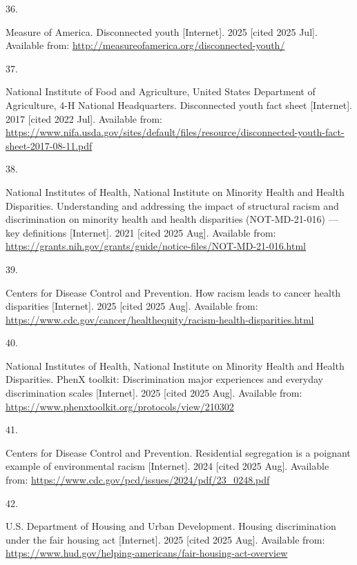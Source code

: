 \documentclass[
  english,
  letterpaper,
]{report}
\newlength{\cslhangindent}
\newlength{\csllabelwidth}
\newenvironment{CSLReferences}[2] %
 {\begin{list}{}{%
  \setlength{\itemindent}{0pt}
  \setlength{\leftmargin}{0pt}
  \setlength{\parsep}{0pt}
  \ifodd #1
   \setlength{\leftmargin}{\cslhangindent}
   \setlength{\itemindent}{-1\cslhangindent}
  \fi
  \setlength{\itemsep}{#2\baselineskip}}}
 {\end{list}}
\newcommand{\CSLLeftMargin}[1]{\parbox[t]{\csllabelwidth}{\strut#1\strut}}
\newcommand{\CSLRightInline}[1]{\parbox[t]{\linewidth - \csllabelwidth}{\strut#1\strut}}
\begin{document}
\begin{CSLReferences}{0}{1}
\CSLLeftMargin{36. }%
\CSLRightInline{Measure of America. Disconnected youth {[}Internet{]}.
2025 {[}cited 2025 Jul{]}. Available from:
\url{http://measureofamerica.org/disconnected-youth/}}

\CSLLeftMargin{37. }%
\CSLRightInline{National Institute of Food and Agriculture, United
States Department of Agriculture, 4-H National Headquarters.
Disconnected youth fact sheet {[}Internet{]}. 2017 {[}cited 2022 Jul{]}.
Available from:
\url{https://www.nifa.usda.gov/sites/default/files/resource/disconnected-youth-fact-sheet-2017-08-11.pdf}}

\CSLLeftMargin{38. }%
\CSLRightInline{National Institutes of Health, National Institute on
Minority Health and Health Disparities. Understanding and addressing the
impact of structural racism and discrimination on minority health and
health disparities (NOT-MD-21-016) --- key definitions {[}Internet{]}.
2021 {[}cited 2025 Aug{]}. Available from:
\url{https://grants.nih.gov/grants/guide/notice-files/NOT-MD-21-016.html}}

\CSLLeftMargin{39. }%
\CSLRightInline{Centers for Disease Control and Prevention. How racism
leads to cancer health disparities {[}Internet{]}. 2025 {[}cited 2025
Aug{]}. Available from:
\url{https://www.cdc.gov/cancer/healthequity/racism-health-disparities.html}}

\CSLLeftMargin{40. }%
\CSLRightInline{National Institutes of Health, National Institute on
Minority Health and Health Disparities. PhenX toolkit: Discrimination
major experiences and everyday discrimination scales {[}Internet{]}.
2025 {[}cited 2025 Aug{]}. Available from:
\url{https://www.phenxtoolkit.org/protocols/view/210302}}

\CSLLeftMargin{41. }%
\CSLRightInline{Centers for Disease Control and Prevention. Residential
segregation is a poignant example of environmental racism
{[}Internet{]}. 2024 {[}cited 2025 Aug{]}. Available from:
\url{https://www.cdc.gov/pcd/issues/2024/pdf/23_0248.pdf}}

\CSLLeftMargin{42. }%
\CSLRightInline{U.S. Department of Housing and Urban Development.
Housing discrimination under the fair housing act {[}Internet{]}. 2025
{[}cited 2025 Aug{]}. Available from:
\url{https://www.hud.gov/helping-americans/fair-housing-act-overview}}


\end{CSLReferences}
\end{document}
